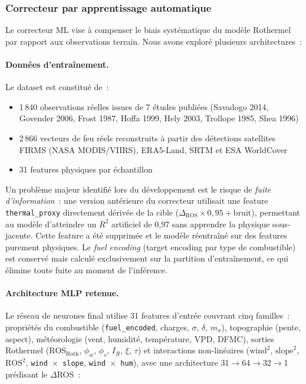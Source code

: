 \subsubsection{Correcteur par apprentissage automatique}

Le correcteur ML vise à compenser le biais systématique du modèle Rothermel par rapport aux observations terrain. Nous avons exploré plusieurs architectures~:

\paragraph{Données d'entraînement.} Le dataset est constitué de~:
\begin{itemize}[nosep]
    \item 1\,840 observations réelles issues de 7 études publiées (Savadogo 2014, Govender 2006, Frost 1987, Hoffa 1999, Hely 2003, Trollope 1985, Shea 1996)
    \item 2\,866 vecteurs de feu réels reconstruits à partir des détections satellites FIRMS (NASA MODIS/VIIRS), ERA5-Land, SRTM et ESA WorldCover
    \item 31 features physiques par échantillon
\end{itemize}

Un problème majeur identifié lors du développement est le risque de \textit{fuite d'information}~: une version antérieure du correcteur utilisait une feature \texttt{thermal\_proxy} directement dérivée de la cible ($\Delta_{\text{ROS}} \times 0{,}95 + \text{bruit}$), permettant au modèle d'atteindre un $R^2$ artificiel de 0,97 sans apprendre la physique sous-jacente. Cette feature a été supprimée et le modèle réentraîné sur des features purement physiques. Le \textit{fuel encoding} (target encoding par type de combustible) est conservé mais calculé exclusivement sur la partition d'entraînement, ce qui élimine toute fuite au moment de l'inférence.

\paragraph{Architecture MLP retenue.} Le réseau de neurones final utilise 31 features d'entrée couvrant cinq familles~: propriétés du combustible (\texttt{fuel\_encoded}, charges, $\sigma$, $\delta$, $m_x$), topographie (pente, aspect), météorologie (vent, humidité, température, VPD, DFMC), sorties Rothermel ($\text{ROS}_{\text{Roth}}$, $\phi_w$, $\phi_s$, $I_R$, $\xi$, $\tau$) et interactions non-linéaires ($\text{wind}^2$, $\text{slope}^2$, $\text{ROS}^2$, \texttt{wind\,$\times$\,slope}, \texttt{wind\,$\times$\,hum}), avec une architecture 31$\rightarrow$64$\rightarrow$32$\rightarrow$1 prédisant le $\Delta$ROS~:

